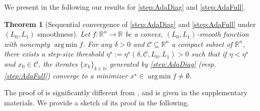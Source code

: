 \documentclass{article}
\theoremstyle{plain}
\newtheorem{theorem}{Theorem}
\theoremstyle{definition}
\theoremstyle{remark}
\newcommand{\argmin}{\operatorname{arg\,min}}
\newcommand*{\RR}{\mathbb{R}}
\newcommand*{\NN}{\mathbb{N}}
\begin{document}
We present in the following our results for \ref{step:AdaDiag} and \ref{step:AdaFull}.
\begin{theorem}[Sequential convergence of \ref{step:AdaDiag} and \ref{step:AdaFull} under $(L_0,L_1)$ smoothness]\label{theorem:adagrad-l0-l1-convergence}
Let $f:\RR^n \to \RR$ be a convex, $(L_0,L_1)$-smooth function with nonempty $\argmin f$.
For any $\delta > 0$ and $\mathcal{C} \subseteq \RR^n$ a compact subset of $\RR^n$, there exists a step-size threshold $\eta^\star := \eta^\star(\delta, \mathcal{C},L_0,L_1) > 0$ such that if $\eta < \eta^\star$ and $x_0 \in \mathcal{C}$, the iterates $\{x_k\}_{k \in \NN}$ generated by 
\ref{step:AdaDiag} (resp. \ref{step:AdaFull}) converge to a minimizer $x^\star \in \argmin f \neq \emptyset$. 
\end{theorem}
The proof of  is significantly different from , and is given in the supplementary materials. We provide a sketch of its proof in the following.
\end{document}
